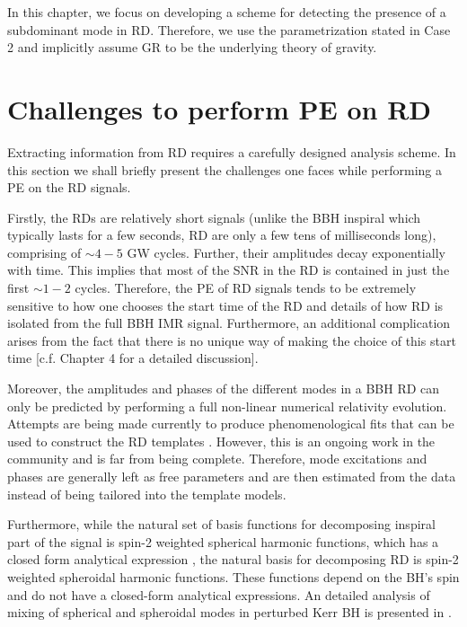 In this chapter, we focus on developing a scheme for detecting the presence of a subdominant mode in RD. Therefore, we use the parametrization stated in  Case 2 and implicitly assume GR to be the underlying theory of gravity.  

\section{Challenges to perform PE on RD}
\label{sec:RDPE-problems}

Extracting information from RD requires a carefully designed analysis scheme. In this section we shall briefly present the challenges one faces while performing a PE on the RD signals.

Firstly, the RDs are relatively short signals (unlike the BBH inspiral which typically lasts for a few seconds, RD are only a few tens of milliseconds long), comprising of $\sim 4-5$ GW cycles. Further, their amplitudes decay exponentially with time. This implies that most of the SNR in the RD is contained in just the first $\sim 1-2$ cycles. Therefore, the PE of RD signals tends to be extremely sensitive to how one chooses the start time of the RD and details of how RD is isolated from the full BBH IMR signal. Furthermore, an additional complication arises from the fact that there is no unique way of making the choice of this start time [c.f. Chapter 4 for a detailed discussion]. 

Moreover, the amplitudes and phases of the different modes in a BBH RD can only be predicted by performing a full non-linear numerical relativity evolution. Attempts are being made currently to produce phenomenological fits that can be used to construct the RD templates \cite{London2,London}. However, this is an ongoing work in the community and is far from being complete. Therefore, mode excitations and phases are generally left as free parameters and are then estimated from the data instead of being tailored into the template models. 

Furthermore, while the natural set of basis functions for decomposing inspiral part of the signal is spin-2 weighted spherical harmonic functions, which has a closed form analytical expression \cite{2016JMP....57i2504B, }, the natural basis for decomposing RD is spin-2 weighted spheroidal harmonic functions. These functions depend on the BH's spin and do not have a closed-form analytical expressions. An detailed analysis of  mixing of spherical and spheroidal modes in perturbed Kerr BH is presented in \cite{2014PhRvD..90f4012B}. 

